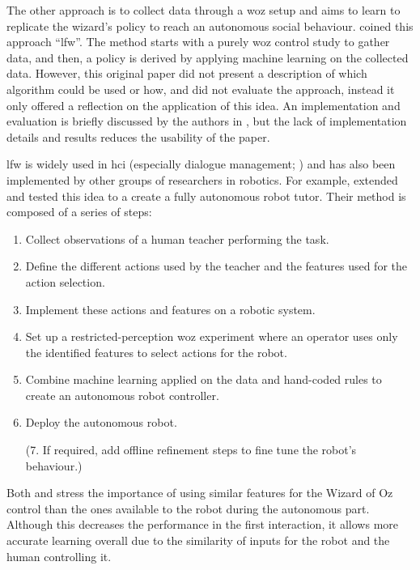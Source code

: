 The other approach is to collect data through a \gls{woz} setup and aims to learn to replicate the wizard's policy to reach an autonomous social behaviour. \cite{knox2014learning} coined this approach ``\gls{lfw}''. The method starts with a purely \gls{woz} control study to gather data, and then, a policy is derived by applying machine learning on the collected data. However, this original paper did not present a description of which algorithm could be used or how, and did not evaluate the approach, instead it only offered a reflection on the application of this idea. An implementation and evaluation is briefly discussed by the authors in \cite{knox2016learning}, but the lack of implementation details and results reduces the usability of the paper.

\gls{lfw} is widely used in \gls{hci} (especially dialogue management; \citealt{rieser2008learning}) and has also been implemented by other groups of researchers in robotics. For example, \citet{sequeira2016discovering} extended and tested this idea to a create a fully autonomous robot tutor. Their method is composed of a series of steps: 
\begin{enumerate}
   	\item Collect observations of a human teacher performing the task.
   	\item Define the different actions used by the teacher and the features used for the action selection.
   	\item Implement these actions and features on a robotic system.
   	\item Set up a restricted-perception \gls{woz} experiment where an operator uses only the identified features to select actions for the robot.
   	\item Combine machine learning applied on the data and hand-coded rules to create an autonomous robot controller.
   	\item Deploy the autonomous robot.
   	\item[(7.] If required, add offline refinement steps to fine tune the robot's behaviour.)
\end{enumerate}

Both \citet{knox2014learning} and \citet{sequeira2016discovering} stress the importance of using similar features for the Wizard of Oz control than the ones available to the robot during the autonomous part. Although this decreases the performance in the first interaction, it allows more accurate learning overall due to the similarity of inputs for the robot and the human controlling it.
    
